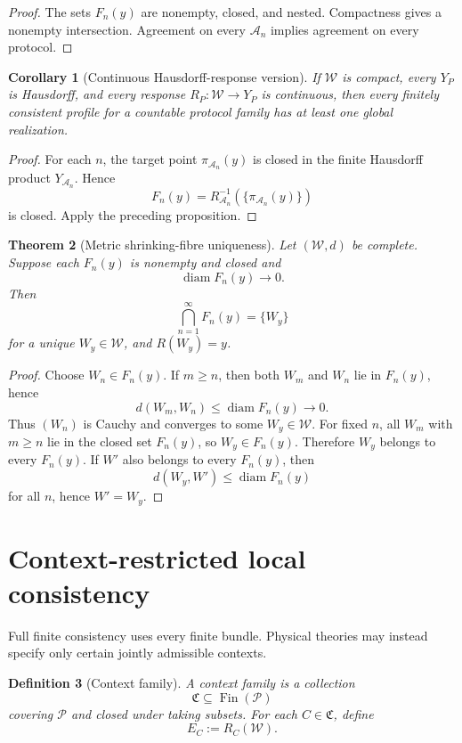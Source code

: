 \documentclass[11pt]{article}
\newtheorem{definition}{Definition}[section]
\newtheorem{theorem}[definition]{Theorem}
\newtheorem{corollary}[definition]{Corollary}
\newcommand{\W}{\mathcal W}
\newcommand{\Pcal}{\mathcal P}
\newcommand{\Acal}{\mathcal A}
\newcommand{\Fin}{\operatorname{Fin}}
\begin{document}
\begin{proof}
The sets $F_n(y)$ are nonempty, closed, and nested. Compactness gives a
nonempty intersection. Agreement on every $\Acal_n$ implies agreement on every
protocol.
\end{proof}

\begin{corollary}[Continuous Hausdorff-response version]
If $\W$ is compact, every $Y_P$ is Hausdorff, and every response
$R_P:\W\to Y_P$ is continuous, then every finitely consistent profile for a
countable protocol family has at least one global realization.
\end{corollary}

\begin{proof}
For each $n$, the target point $\pi_{\Acal_n}(y)$ is closed in the finite
Hausdorff product $Y_{\Acal_n}$. Hence
\[
F_n(y)=R_{\Acal_n}^{-1}\!\left(\{\pi_{\Acal_n}(y)\}\right)
\]
is closed. Apply the preceding proposition.
\end{proof}

\begin{theorem}[Metric shrinking-fibre uniqueness]\label{thm:shrinking}
Let $(\W,d)$ be complete. Suppose each $F_n(y)$ is nonempty and closed and
\[
\operatorname{diam}F_n(y)\longrightarrow0.
\]
Then
\[
\bigcap_{n=1}^{\infty}F_n(y)
=
\{W_y\}
\]
for a unique $W_y\in\W$, and $R(W_y)=y$.
\end{theorem}

\begin{proof}
Choose $W_n\in F_n(y)$. If $m\ge n$, then both $W_m$ and $W_n$ lie in
$F_n(y)$, hence
\[
d(W_m,W_n)\le\operatorname{diam}F_n(y)\to0.
\]
Thus $(W_n)$ is Cauchy and converges to some $W_y\in\W$. For fixed $n$, all
$W_m$ with $m\ge n$ lie in the closed set $F_n(y)$, so $W_y\in F_n(y)$.
Therefore $W_y$ belongs to every $F_n(y)$. If $W'$ also belongs to every
$F_n(y)$, then
\[
d(W_y,W')\le\operatorname{diam}F_n(y)
\]
for all $n$, hence $W'=W_y$.
\end{proof}

\section{Context-restricted local consistency}

Full finite consistency uses every finite bundle. Physical theories may instead
specify only certain jointly admissible contexts.

\begin{definition}[Context family]
A \emph{context family} is a collection
\[
\mathfrak C\subseteq\Fin(\Pcal)
\]
covering $\Pcal$ and closed under taking subsets. For each
$C\in\mathfrak C$, define
\[
E_C:=R_C(\W).
\]
\end{definition}
\end{document}
